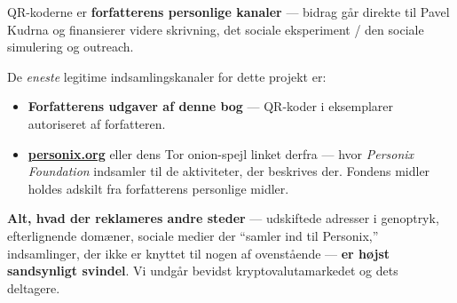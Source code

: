 \begin{minipage}[t]{0.60\textwidth}
\vspace{0pt}
\begin{mdframed}[
  linewidth=0.7pt,roundcorner=5pt,
  innerleftmargin=10pt,innerrightmargin=10pt,
  innertopmargin=8pt,innerbottommargin=8pt,
  skipabove=0pt,skipbelow=0pt,
  linecolor=cbwarning!50,backgroundcolor=cbwarning!5,
  nobreak=true,
  needspace=4\baselineskip,
]
\footnotesize
QR-koderne er \textbf{forfatterens personlige kanaler} --- bidrag går direkte til Pavel Kudrna og finansierer videre skrivning, det sociale eksperiment / den sociale simulering og outreach.

\smallskip
De \emph{eneste} legitime indsamlingskanaler for dette projekt er:

\smallskip
\begin{itemize}
\setlength{\itemsep}{0pt}
\setlength{\topsep}{0pt}
\item \textbf{Forfatterens udgaver af denne bog} --- QR-koder i eksemplarer autoriseret af forfatteren.
\item \href{https://personix.org}{\textbf{personix.org}} eller dens Tor onion-spejl linket derfra --- hvor \emph{Personix Foundation} indsamler til de aktiviteter, der beskrives der. Fondens midler holdes adskilt fra forfatterens personlige midler.
\end{itemize}

\smallskip
\textbf{Alt, hvad der reklameres andre steder} --- udskiftede adresser i genoptryk, efterlignende domæner, sociale medier der ``samler ind til Personix,'' indsamlinger, der ikke er knyttet til nogen af ovenstående --- \textbf{er højst sandsynligt svindel}. Vi undgår bevidst kryptovalutamarkedet og dets deltagere.
\end{mdframed}
\end{minipage}

\clearpage
